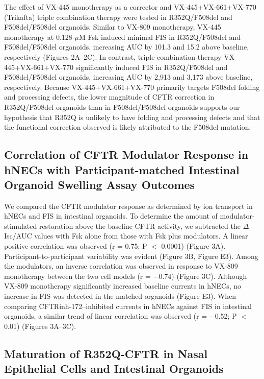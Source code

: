 The effect of VX-445 monotherapy as a corrector and VX-445+VX-661+VX-770 (Trikafta) triple combination therapy were tested in R352Q/F508del and F508del/F508del organoids. Similar to VX-809 monotherapy, VX-445 monotherapy at 0.128 $\mu$M Fsk induced minimal FIS in R352Q/F508del and F508del/F508del organoids, increasing AUC by 101.3 and 15.2 above baseline, respectively (Figures 2A–2C). In contrast, triple combination therapy VX-445+VX-661+VX-770 significantly induced FIS in R352Q/F508del and F508del/F508del organoids, increasing AUC by 2,913 and 3,173 above baseline, respectively. Because VX-445+VX-661+VX-770 primarily targets F508del folding and processing defects, the lower magnitude of CFTR correction in R352Q/F508del organoids than in F508del/F508del organoids supports our hypothesis that R352Q is unlikely to have folding and processing defects and that the functional correction observed is likely attributed to the F508del mutation.

\subsection{Correlation of CFTR Modulator Response in hNECs with Participant-matched Intestinal Organoid Swelling Assay Outcomes}

We compared the CFTR modulator response as determined by ion transport in hNECs and FIS in intestinal organoids. To determine the amount of modulator-stimulated restoration above the baseline CFTR activity, we subtracted the $\Delta$Isc/AUC values with Fsk alone from those with Fsk plus modulators. A linear positive correlation was observed (r = 0.75; P $<$ 0.0001) (Figure 3A). Participant-to-participant variability was evident (Figure 3B, Figure E3). Among the modulators, an inverse correlation was observed in response to VX-809 monotherapy between the two cell models (r = −0.74) (Figure 3C). Although VX-809 monotherapy significantly increased baseline currents in hNECs, no increase in FIS was detected in the matched organoids (Figure E3). When comparing CFTRinh-172–inhibited currents in hNECs against FIS in intestinal organoids, a similar trend of linear correlation was observed (r = −0.52; P $<$ 0.01) (Figures 3A–3C).

\subsection{Maturation of R352Q-CFTR in Nasal Epithelial Cells and Intestinal Organoids}

